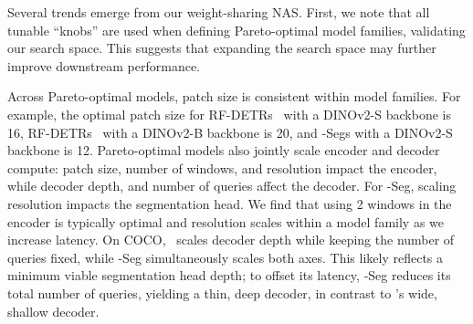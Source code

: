 Several trends emerge from our weight-sharing NAS. First, we note that all tunable ``knobs'' are used when defining Pareto-optimal model families, validating our search space. This suggests that expanding the search space may further improve downstream performance.

Across Pareto-optimal models, patch size is consistent within model families. For example, the optimal patch size for RF-DETRs \ with a DINOv2-S backbone is 16, RF-DETRs \ with a DINOv2-B backbone is 20, and \method-Segs with a DINOv2-S backbone is 12. Pareto-optimal models also jointly scale encoder and decoder compute: patch size, number of windows, and resolution impact the encoder, while decoder depth, and number of queries affect the decoder. For \method-Seg, scaling resolution impacts the segmentation head. We find that using 2 windows in the encoder is typically optimal and resolution scales within a model family as we increase latency. On COCO, \method \ scales decoder depth while keeping the number of queries fixed, while \method-Seg simultaneously scales both axes. This likely reflects a minimum viable segmentation head depth; to offset its latency, \method-Seg reduces its total number of queries, yielding a thin, deep decoder, in contrast to \method’s wide, shallow decoder.


